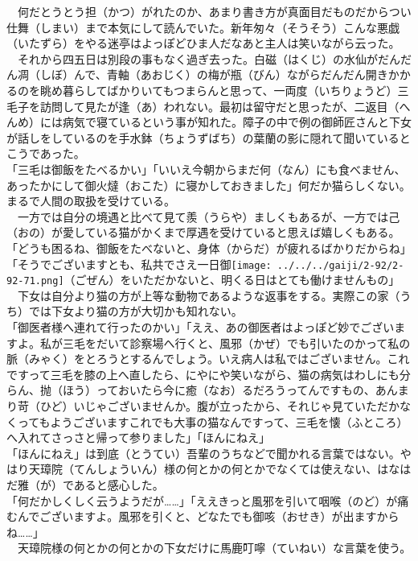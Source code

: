 　何だとうとう担（かつ）がれたのか、あまり書き方が真面目だものだからつい仕舞（しまい）まで本気にして読んでいた。新年匆々（そうそう）こんな悪戯（いたずら）をやる迷亭はよっぽどひま人だなあと主人は笑いながら云った。\\
　それから四五日は別段の事もなく過ぎ去った。白磁（はくじ）の水仙がだんだん凋（しぼ）んで、青軸（あおじく）の梅が瓶（びん）ながらだんだん開きかかるのを眺め暮らしてばかりいてもつまらんと思って、一両度（いちりょうど）三毛子を訪問して見たが逢（あ）われない。最初は留守だと思ったが、二返目（へんめ）には病気で寝ているという事が知れた。障子の中で例の御師匠さんと下女が話しをしているのを手水鉢（ちょうずばち）の葉蘭の影に隠れて聞いているとこうであった。\\
「三毛は御飯をたべるかい」「いいえ今朝からまだ何（なん）にも食べません、あったかにして御火燵（おこた）に寝かしておきました」何だか猫らしくない。まるで人間の取扱を受けている。\\
　一方では自分の境遇と比べて見て羨（うらや）ましくもあるが、一方では己（おの）が愛している猫がかくまで厚遇を受けていると思えば嬉しくもある。\\
「どうも困るね、御飯をたべないと、身体（からだ）が疲れるばかりだからね」「そうでございますとも、私共でさえ一日御\texttt{[image: ../../../gaiji/2-92/2-92-71.png]}（ごぜん）をいただかないと、明くる日はとても働けませんもの」\\
　下女は自分より猫の方が上等な動物であるような返事をする。実際この家（うち）では下女より猫の方が大切かも知れない。\\
「御医者様へ連れて行ったのかい」「ええ、あの御医者はよっぽど妙でございますよ。私が三毛をだいて診察場へ行くと、風邪（かぜ）でも引いたのかって私の脈（みゃく）をとろうとするんでしょう。いえ病人は私ではございません。これですって三毛を膝の上へ直したら、にやにや笑いながら、猫の病気はわしにも分らん、抛（ほう）っておいたら今に癒（なお）るだろうってんですもの、あんまり苛（ひど）いじゃございませんか。腹が立ったから、それじゃ見ていただかなくってもようございますこれでも大事の猫なんですって、三毛を懐（ふところ）へ入れてさっさと帰って参りました」「ほんにねえ」\\
「ほんにねえ」は到底（とうてい）吾輩のうちなどで聞かれる言葉ではない。やはり天璋院（てんしょういん）様の何とかの何とかでなくては使えない、はなはだ雅（が）であると感心した。\\
「何だかしくしく云うようだが\ldots{}\ldots{}」「ええきっと風邪を引いて咽喉（のど）が痛むんでございますよ。風邪を引くと、どなたでも御咳（おせき）が出ますからね\ldots{}\ldots{}」\\
　天璋院様の何とかの何とかの下女だけに馬鹿叮嚀（ていねい）な言葉を使う。\\
